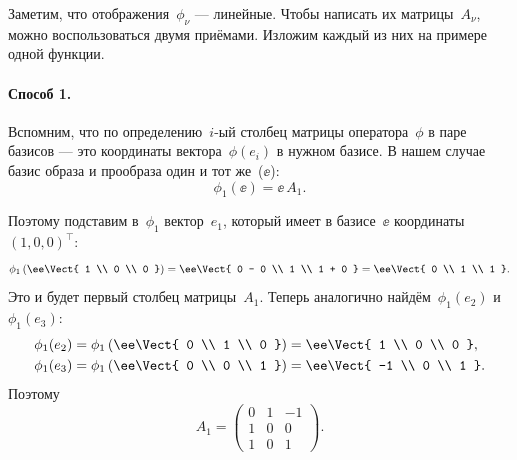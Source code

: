\begin{proofm}
	Заметим, что отображения~$\phi_\nu$ --- линейные. Чтобы написать их матрицы~$A_\nu$, можно воспользоваться двумя приёмами. Изложим каждый из них на примере одной функции.

	\paragraph{Способ 1.} Вспомним, что по определению~$i$-ый столбец матрицы оператора~$\phi$ в паре базисов --- это координаты вектора~$\phi(e_i)$ в нужном базисе. В нашем случае базис образа и прообраза один и тот же~($\ee$):
	\[
		\phi_1(\ee) = \ee\,A_1
		.
	\]

	Поэтому подставим в~$\phi_1$ вектор~$e_1$, который имеет в базисе~$\ee$ координаты~$(1, 0, 0)^\top$:
	\[
		\phi_1
		\left( 
			\ee
			\Vect{
				1 \\ 0 \\ 0
			}
		\right)
		=
		\ee
		\Vect{
			0 - 0 \\
			1 \\
			1 + 0
		}
		=
		\ee
		\Vect{
			0 \\ 1 \\ 1
		}
		.
	\]
	Это и будет первый столбец матрицы~$A_1$. Теперь аналогично найдём~$\phi_1(e_2)$ и $\phi_1(e_3)$:
	\begin{align*}
		\phi_1(e_2) &=
		\phi_1
		\left( 
			\ee
			\Vect{
				0 \\ 1 \\ 0
			}
		\right)
		=
		\ee
		\Vect{
			1 \\ 0 \\ 0
		},
		\\
		\phi_1(e_3) &=
		\phi_1
		\left( 
			\ee
			\Vect{
				0 \\ 0 \\ 1
			}
		\right)
		=
		\ee
		\Vect{
			-1 \\ 0 \\ 1
		}.
	\end{align*}
	Поэтому
	\[
		A_1 =
		\begin{pmatrix}
			0 & 1 & -1
			\\
			1 & 0 & 0
			\\
			1 & 0 & 1
		\end{pmatrix}
		.
	\]


\end{proofm}
